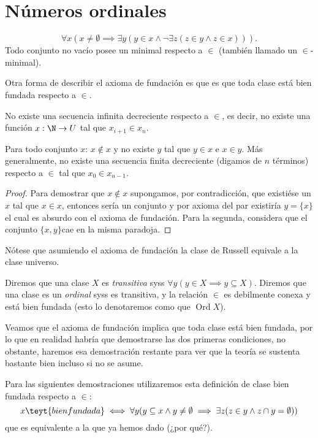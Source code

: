 \documentclass[11pt,a4paper]{book}
\DeclareMathOperator{\Ord}{Ord}
\begin{document}
\section{Números ordinales}
\begin{axiom}
	$$\forall x(x\neq\emptyset\implies\exists y(y\in x\wedge\neg\exists z(z\in y\wedge z\in x))).$$
	Todo conjunto no vacío posee un minimal respecto a $\in$ (también llamado un $\in$-minimal).
\end{axiom}
Otra forma de describir el axioma de fundación es que es que toda clase está bien fundada respecto a $\in$.
\begin{cor}
	No existe una secuencia infinita decreciente respecto a $\in$, es decir, no existe una función $x:\N\rightarrow U$ tal que $x_{i+1}\in x_n$.
\end{cor}
\begin{thm}\label{thm:well-founded-in-sequence}
	Para todo conjunto $x$: $x\notin x$ y no existe $y$ tal que $y\in x$ e $x\in y$. Más generalmente, no existe una secuencia finita decreciente (digamos de $n$ términos) respecto a $\in$ tal que $x_0\in x_{n-1}$.
\end{thm}
\begin{proof}
	Para demostrar que $x\notin x$ supongamos, por contradicción, que existiése un $x$ tal que $x\in x$, entonces sería un conjunto y por axioma del par existiría $y=\{x\}$ el cual es absurdo con el axioma de fundación. Para la segunda, considera que el conjunto $\{x,y\}$cae en la misma paradoja.
\end{proof}
Nótese que asumiendo el axioma de fundación la clase de Russell equivale a la clase universo.
\begin{mydef}
	Diremos que una clase $X$ es \textit{transitiva} syss $\forall y(y\in X\implies y\subseteq X)$. Diremos que una clase es un \textit{ordinal} syss es transitiva, y la relación $\in$ es debilmente conexa y está bien fundada (esto lo denotaremos como que $\Ord X$\nomenclature{$\Ord$}{Tal clase es un ordinal}).
\end{mydef}
Veamos que el axioma de fundación implica que toda clase está bien fundada, por lo que en realidad habría que demostrarse las dos primeras condiciones, no obstante, haremos esa demostración restante para ver que la teoría se sustenta bastante bien incluso si no se asume.

Para las siguientes demostraciones utilizaremos esta definición de clase bien fundada respecto a $\in$:
$$x\teyt{ bien fundada}\iff\forall y(y\subseteq x\wedge y\neq\emptyset\implies\exists z(z\in y\wedge z\cap y=\emptyset))$$
que es equivalente a la que ya hemos dado (¿por qué?).
\end{document}
